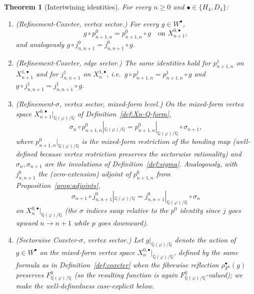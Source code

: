 \documentclass[11pt, a4paper]{amsart}
\newtheorem{theorem}{Theorem}[section]
\theoremstyle{definition}
\newcommand{\Q}{\mathbb{Q}}
\begin{document}
\begin{theorem}[Intertwining identities]
\label{thm:commute}
For every $n \geq 0$ and $\bullet \in \{H_4, D_4\}$:
\begin{enumerate}
\item (Refinement-Coxeter, vertex sector.) For every $g \in W^
  \bullet$,
  \[
    g \circ p_{n+1, n}^0 = p_{n+1, n}^0 \circ g
    \quad \text{on } X_{n+1}^{0, \bullet},
  \]
  and analogously $g \circ j_{n, n+1}^0 = j_{n, n+1}^0 \circ g$.
\item (Refinement-Coxeter, edge sector.) The same identities hold
  for $p_{n+1, n}^1$ on $X_{n+1}^{1, \bullet}$ and for
  $j_{n, n+1}^1$ on $X_n^{1, \bullet}$, i.e.\
  $g \circ p_{n+1, n}^1 = p_{n+1, n}^1 \circ g$ and
  $g \circ j_{n, n+1}^1 = j_{n, n+1}^1 \circ g$.
\item (Refinement-$\sigma$, vertex sector, mixed-form level.) On
  the mixed-form vertex space
  $X_{n+1}^{0, \bullet}|_{\Q(\varphi)/\Q}$ of
  Definition~\ref{def:Xn-Q-form},
  \[
    \sigma_{n} \circ p_{n+1, n}^0|_{\Q(\varphi)/\Q}
    = p_{n+1, n}^0|_{\Q(\varphi)/\Q} \circ \sigma_{n+1},
  \]
  where $p_{n+1, n}^0|_{\Q(\varphi)/\Q}$ is the mixed-form
  restriction of the bonding map (well-defined because vertex
  restriction preserves the sectorwise rationality)
  and $\sigma_n, \sigma_{n+1}$ are the involutions of
  Definition~\ref{def:sigma}. Analogously, with $j_{n, n+1}^0$
  the (zero-extension) adjoint of $p_{n+1, n}^0$ from
  Proposition~\ref{prop:adjoints},
  \[
    \sigma_{n+1} \circ j_{n, n+1}^0|_{\Q(\varphi)/\Q}
    = j_{n, n+1}^0|_{\Q(\varphi)/\Q} \circ \sigma_n
  \]
  on $X_n^{0, \bullet}|_{\Q(\varphi)/\Q}$ (the $\sigma$ indices swap
  relative to the $p^0$ identity since $j$ goes upward
  $n \to n+1$ while $p$ goes downward).
\item (Sectorwise Coxeter-$\sigma$, vertex sector.)
  Let $g|_{\Q(\varphi)/\Q}$ denote the action of $g \in W^\bullet$
  on the mixed-form vertex space
  $X_n^{0, \bullet}|_{\Q(\varphi)/\Q}$, defined by the same
  formula as in Definition~\ref{def:coxeter} when the fibrewise
  reflection $\rho_{F^0}^\bullet(g)$ preserves
  $F^0_{\Q(\varphi)/\Q}$ (so the resulting function is again
  $F^0_{\Q(\varphi)/\Q}$-valued); we make the well-definedness
  case-explicit below.


\end{enumerate}
\end{theorem}
\end{document}
